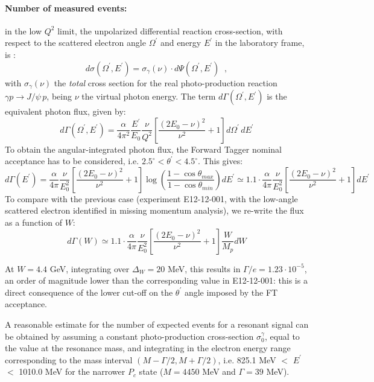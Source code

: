 \paragraph{Number of measured events: } in the low $Q^{2}$ limit, the unpolarized differential reaction cross-section, with respect to the scattered electron angle $\Omega^{\prime}$ and energy $E^{\prime}$ in the laboratory frame, is \cite{Budnev:1974de}:
\begin{equation}
d\sigma(\Omega^{\prime},E^{\prime}) = \sigma_\gamma(\nu) \cdot d \Psi(\Omega^{\prime},E^{\prime}) \; \; ,
\end{equation}
with $\sigma_\gamma(\nu)$ the \textit{total} cross section for the real photo-production reaction $\gamma p \rightarrow J/\psi\, p$, being $\nu$ the virtual photon energy. The term $d \Gamma(\Omega^{\prime},E^{\prime})$ is the equivalent photon flux, given by:
\begin{equation}
d\Gamma(\Omega^{\prime},E^{\prime})=\frac{\alpha}{4\pi^{2}}\frac{E^{\prime}}{E_0}\frac{\nu}{Q^2}\left[\frac{(2E_0-\nu)^2}{\nu^2}+1  \right] d\Omega^{\prime} \,d E^{\prime}
\end{equation}
To obtain the angular-integrated photon flux, the Forward Tagger nominal acceptance has to be considered, i.e. $2.5^{\circ}<\theta^{\prime}<4.5^{\circ}$. This gives:
\begin{equation}
d\Gamma(E^{\prime})=\frac{\alpha}{4\pi}\frac{\nu}{E^2_0}\left[\frac{(2E_0-\nu)^2}{\nu^2}+1  \right] \log{ \left( \frac{1-\cos\theta_{max}}{1-\cos\theta_{min}}      \right)} d E^{\prime} \simeq 1.1 \cdot \frac{\alpha}{4\pi}\frac{\nu}{E^2_0}\left[\frac{(2E_0-\nu)^2}{\nu^2}+1  \right] d E^{\prime}
\end{equation}
To compare with the previous case (experiment E12-12-001, with the low-angle scattered electron identified in missing momentum analysis), we re-write the flux as a function of $W$:
\begin{equation}
d\Gamma(W) \simeq 1.1 \cdot \frac{\alpha}{4\pi}\frac{\nu}{E^2_0}\left[\frac{(2E_0-\nu)^2}{\nu^2}+1  \right]\frac{W}{M_p}dW
\end{equation}

At $W=4.4$ GeV, integrating over $\Delta_W=20$ MeV, this results in $\Gamma/e=1.23\cdot 10^{-5}$, an order of magnitude lower than the corresponding value in E12-12-001: 
this is a direct consequence of the lower cut-off on the $\theta^{\prime}$ angle imposed by the FT acceptance.

A reasonable estimate for the number of expected events for a resonant signal can be obtained by assuming a constant photo-production cross-section $\sigma^{\gamma}_0$, equal to the value at the resonance mass, 
and integrating in the electron energy range corresponding to the mass interval $(M-\Gamma/2,M+\Gamma/2)$, i.e. 825.1 MeV $<$ $E^{\prime}$ $<$ 1010.0 MeV for the narrower $P_c$ state ($M=4450$ MeV and $\Gamma=39$ MeV).

